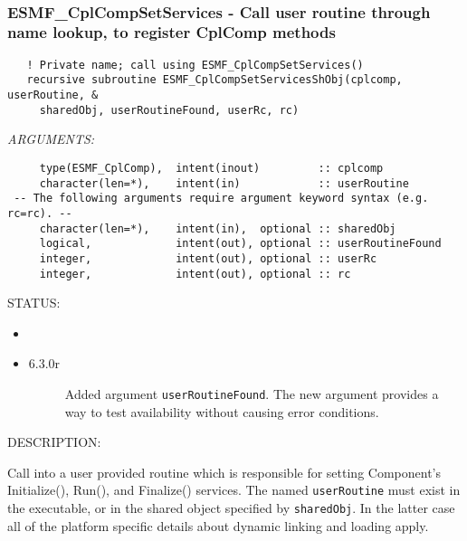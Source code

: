  
\mbox{}\hrulefill\ 
 
\subsubsection [ESMF\_CplCompSetServices] {ESMF\_CplCompSetServices - Call user routine through name lookup, to register CplComp methods}


  
\begin{verbatim}   ! Private name; call using ESMF_CplCompSetServices()
   recursive subroutine ESMF_CplCompSetServicesShObj(cplcomp, userRoutine, &
     sharedObj, userRoutineFound, userRc, rc)\end{verbatim}{\em ARGUMENTS:}
\begin{verbatim}     type(ESMF_CplComp),  intent(inout)         :: cplcomp
     character(len=*),    intent(in)            :: userRoutine
 -- The following arguments require argument keyword syntax (e.g. rc=rc). --
     character(len=*),    intent(in),  optional :: sharedObj
     logical,             intent(out), optional :: userRoutineFound
     integer,             intent(out), optional :: userRc
     integer,             intent(out), optional :: rc\end{verbatim}
{\sf STATUS:}
   \begin{itemize}
   \item{}
   \item{}
   \begin{description}
   \item[6.3.0r] Added argument {\tt userRoutineFound}.
                The new argument provides a way to test availability without
                causing error conditions.
   \end{description}
   \end{itemize}
  
{\sf DESCRIPTION:\\ }


   \label{CplComp:SetServicesShObj}
   Call into a user provided routine which is responsible for setting
   Component's Initialize(), Run(), and Finalize() services. The named
   {\tt userRoutine} must exist in the executable, or in the shared object
   specified by {\tt sharedObj}. In the latter case all of the platform
   specific details about dynamic linking and loading apply.
  
